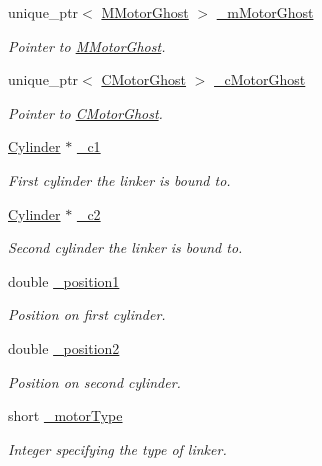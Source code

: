 \begin{DoxyCompactItemize}
\item 
unique\+\_\+ptr$<$ \hyperlink{classMMotorGhost}{M\+Motor\+Ghost} $>$ \hyperlink{classMotorGhost_a651509682f0faffe9b8e2d77e652312b}{\+\_\+m\+Motor\+Ghost}
\begin{DoxyCompactList}\small\item\em Pointer to \hyperlink{classMMotorGhost}{M\+Motor\+Ghost}. \end{DoxyCompactList}\item 
unique\+\_\+ptr$<$ \hyperlink{classCMotorGhost}{C\+Motor\+Ghost} $>$ \hyperlink{classMotorGhost_a9e16cc127c973fe3c8e559daa5922e97}{\+\_\+c\+Motor\+Ghost}
\begin{DoxyCompactList}\small\item\em Pointer to \hyperlink{classCMotorGhost}{C\+Motor\+Ghost}. \end{DoxyCompactList}\item 
\hyperlink{classCylinder}{Cylinder} $\ast$ \hyperlink{classMotorGhost_a0725de6b61fc0eaaa50bf0cb33f933dc}{\+\_\+c1}
\begin{DoxyCompactList}\small\item\em First cylinder the linker is bound to. \end{DoxyCompactList}\item 
\hyperlink{classCylinder}{Cylinder} $\ast$ \hyperlink{classMotorGhost_a0d7606f2ce76db16bb10829fd92a971b}{\+\_\+c2}
\begin{DoxyCompactList}\small\item\em Second cylinder the linker is bound to. \end{DoxyCompactList}\item 
double \hyperlink{classMotorGhost_a94bcda46aa9e2bc0b53ec33fc7e38c3f}{\+\_\+position1}
\begin{DoxyCompactList}\small\item\em Position on first cylinder. \end{DoxyCompactList}\item 
double \hyperlink{classMotorGhost_a1f5b96676836599c4b43b98a4aebe556}{\+\_\+position2}
\begin{DoxyCompactList}\small\item\em Position on second cylinder. \end{DoxyCompactList}\item 
short \hyperlink{classMotorGhost_aadd08ee5f5ab0bf5402da7ebc65d8375}{\+\_\+motor\+Type}
\begin{DoxyCompactList}\small\item\em Integer specifying the type of linker. \end{DoxyCompactList}\item 

\end{DoxyCompactItemize}
